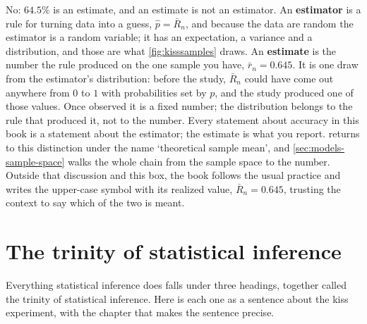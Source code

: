 \begin{pitfall}[is $64.5\%$ an estimator?]
No: $64.5\%$ is an estimate, and an estimate is not an estimator.
An \textbf{estimator} is a rule for turning data into a guess, $\hat{p} = \bar{R}_n$, and because the data are random the estimator is a random variable; it has an expectation, a variance and a distribution, and those are what \cref{fig:kisssamples} draws.
An \textbf{estimate} is the number the rule produced on the one sample you have, $\bar{r}_n = 0.645$.
It is one draw from the estimator's distribution: before the study, $\bar{R}_n$ could have come out anywhere from $0$ to $1$ with probabilities set by $p$, and the study produced one of those values.
Once observed it is a fixed number; the distribution belongs to the rule that produced it, not to the number.
Every statement about accuracy in this book is a statement about the estimator; the estimate is what you report.
 returns to this distinction under the name `theoretical sample mean', and \cref{sec:models-sample-space} walks the whole chain from the sample space to the number.
Outside that discussion and this box, the book follows the usual practice and writes the upper-case symbol with its realized value, $\bar{R}_n = 0.645$, trusting the context to say which of the two is meant.
\end{pitfall}

\section{The trinity of statistical inference}
\label{sec:kiss-trinity}

Everything statistical inference does falls under three headings, together called the trinity of statistical inference.
Here is each one as a sentence about the kiss experiment, with the chapter that makes the sentence precise.

